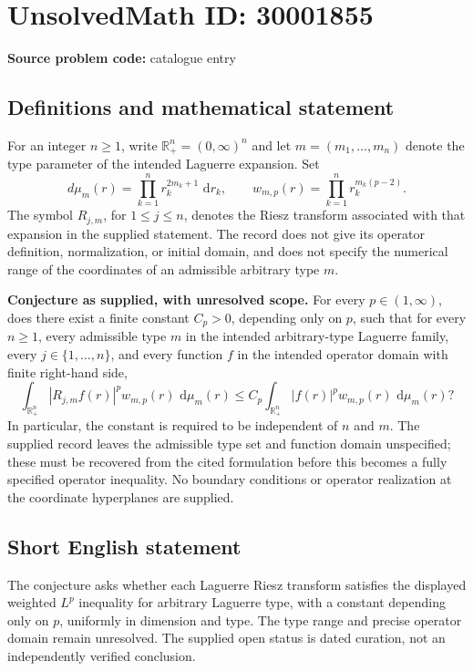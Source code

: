\documentclass[11pt]{article}
\newcommand{\R}{\mathbb{R}}
\newcommand{\dd}{\,\mathrm{d}}
\begin{document}
\section*{UnsolvedMath ID: 30001855}
\textbf{Source problem code:} catalogue entry
\subsection{Definitions and mathematical statement}
For an integer \(n\geq 1\), write \(\R_+^n=(0,\infty)^n\) and let \(m=(m_1,\ldots,m_n)\) denote the type parameter of the intended Laguerre expansion. Set
\[
 d\mu_m(r)=\prod_{k=1}^n r_k^{2m_k+1}\,\dd r_k,
 \qquad
 w_{m,p}(r)=\prod_{k=1}^n r_k^{m_k(p-2)}.
\]
The symbol \(R_{j,m}\), for \(1\leq j\leq n\), denotes the Riesz transform associated with that expansion in the supplied statement. The record does not give its operator definition, normalization, or initial domain, and does not specify the numerical range of the coordinates of an admissible arbitrary type \(m\).

\textbf{Conjecture as supplied, with unresolved scope.} For every \(p\in(1,\infty)\), does there exist a finite constant \(C_p>0\), depending only on \(p\), such that for every \(n\geq1\), every admissible type \(m\) in the intended arbitrary-type Laguerre family, every \(j\in\{1,\ldots,n\}\), and every function \(f\) in the intended operator domain with finite right-hand side,
\[
 \int_{\R_+^n}|R_{j,m}f(r)|^p
       w_{m,p}(r)\,\dd\mu_m(r)
 \leq C_p
 \int_{\R_+^n}|f(r)|^p
       w_{m,p}(r)\,\dd\mu_m(r)?
\]
In particular, the constant is required to be independent of \(n\) and \(m\). The supplied record leaves the admissible type set and function domain unspecified; these must be recovered from the cited formulation before this becomes a fully specified operator inequality. No boundary conditions or operator realization at the coordinate hyperplanes are supplied.
\subsection{Short English statement}
The conjecture asks whether each Laguerre Riesz transform satisfies the displayed weighted \(L^p\) inequality for arbitrary Laguerre type, with a constant depending only on \(p\), uniformly in dimension and type. The type range and precise operator domain remain unresolved. The supplied open status is dated curation, not an independently verified conclusion.
\end{document}
